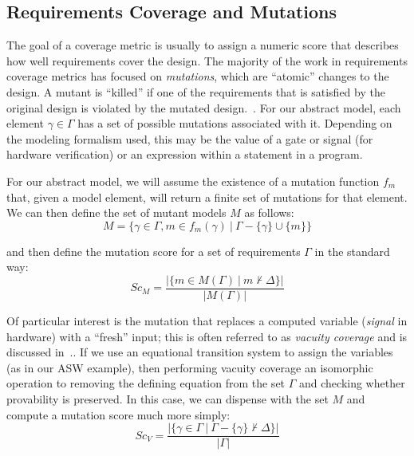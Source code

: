 

\subsection{Requirements Coverage and Mutations}
The goal of a coverage metric is usually to assign a numeric score that describes how well requirements cover the design.  The majority of the work in requirements coverage metrics has focused on {\em mutations}, which are ``atomic'' changes to the design.  A mutant is ``killed'' if one of the requirements that is satisfied by the original design is violated by the mutated design.~\cite{chockler_coverage_2003,chockler2001practical,chockler2010coverage,Kupferman:2006:SCF,kupferman_theory_2008}.  For our abstract model, each element $\gamma \in \Gamma$ has a set of possible mutations associated with it.  Depending on the modeling formalism used, this may be the value of a gate or signal (for hardware verification) or an expression within a statement in a program.


For our abstract model, we will assume the existence of a mutation function $f_{m}$ that, given a model element, will return a finite set of mutations for that element.  We can then define the set of mutant models $M$ as follows:
\[
    M = \{ \gamma \in \Gamma, m \in f_{m}(\gamma)\ |\ \Gamma - \{\gamma\} \cup \{m\} \}
\]

\noindent and then define the mutation score for a set of requirements $\Gamma$ in the standard way:
\[
   Sc_{M} = \frac{ | \{m \in M(\Gamma)~|~ m \nvdash \Delta\} |}{|M(\Gamma)|}
\]


Of particular interest is the mutation that replaces a computed variable ({\em signal} in hardware) with a ``fresh'' input; this is often referred to as {\em vacuity coverage} and is discussed in~\cite{chockler2010coverage,Kupferman:2006:SCF,kupferman_theory_2008}..  If we use an equational transition system to assign the variables (as in our ASW example), then performing vacuity coverage an isomorphic operation to removing the defining equation from the set $\Gamma$ and checking whether provability is preserved.  In this case, we can dispense with the set $M$ and compute a mutation score much more simply:
\[
   Sc_{V} = \frac{ | \{\gamma \in \Gamma~|~ \Gamma - \{\gamma\} \nvdash \Delta\} |}{|\Gamma|}
\]



